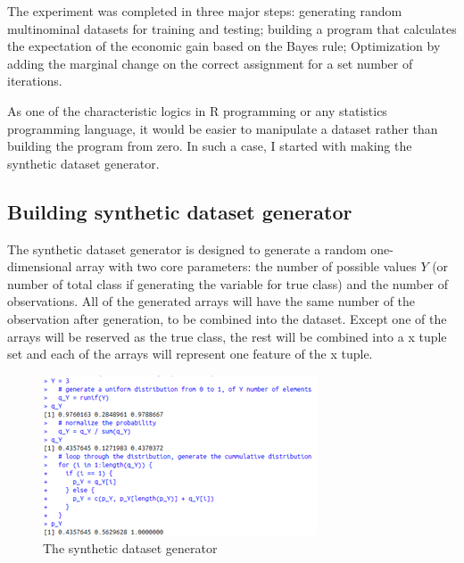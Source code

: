 \documentclass{article}
\begin{document}
\begin{multicols}{2}
        The experiment was completed in three major steps: generating random multinominal datasets for training and testing; building a program that calculates the expectation of the economic gain based on the Bayes rule; Optimization by adding the marginal change on the correct assignment for a set number of iterations.

        As one of the characteristic logics in R programming or any statistics programming language, it would be easier to manipulate a dataset rather than building the program from zero. In such a case, I started with making the synthetic dataset generator. 

        \subsection{Building synthetic dataset generator}

        The synthetic dataset generator is designed to generate a random one-dimensional array with two core parameters: the number of possible values $Y$ (or number of total class if generating the variable for true class) and the number of observations. All of the generated arrays will have the same number of the observation after generation, to be combined into the dataset. Except one of the arrays will be reserved as the true class, the rest will be combined into a x tuple set and each of the arrays will represent one feature of the x tuple.

        \begin{figure}[H]
        \centering
        \includegraphics[width=\linewidth]{fig1.png}
        \caption{The synthetic dataset generator}
        \end{figure}
            

\end{multicols}
\end{document}
